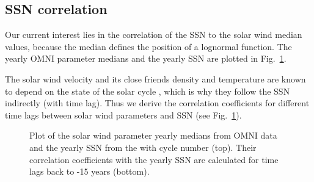 \subsection{SSN correlation}
Our current interest lies in the correlation of the SSN to the solar wind median values, because the median defines the position of a lognormal function. The yearly OMNI parameter medians and the yearly SSN are plotted in Fig.~\ref{fig:OMNI_yearly_ssn_correlation_c_plot}.

The solar wind velocity and its close friends density and temperature are known to depend on the state of the solar cycle \citep{Schwenn1983}, which is why they follow the SSN indirectly (with time lag).
Thus we derive the correlation coefficients for different time lags between solar wind parameters and SSN (see Fig.~\ref{fig:OMNI_yearly_ssn_correlation_c_plot}).
\begin{figure}
	\caption{Plot of the solar wind parameter yearly medians from OMNI data and the yearly SSN from the \citet{sidc} with cycle number (top). Their correlation coefficients with the yearly SSN are calculated for time lags back to -15 years (bottom).}
	\label{fig:OMNI_yearly_ssn_correlation_c_plot}
\end{figure}

